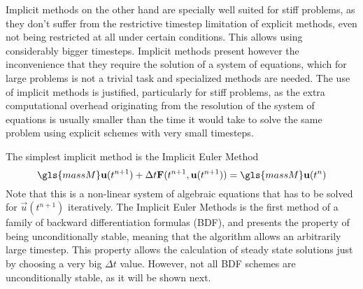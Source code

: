 Implicit methods  on the other hand are specially well suited for stiff problems, as they don't suffer from the restrictive timestep limitation of explicit methods, even not being restricted at all under certain conditions. This allows using considerably bigger timesteps. Implicit methods present however the inconvenience that they require the solution of a system of equations, which for large problems is not a trivial task and specialized methods are needed. The use of implicit methods is justified, particularly for stiff problems, as the extra computational overhead originating from the resolution of the system of equations is usually smaller than the time it would take to solve the same problem using explicit schemes with very small timesteps.

The simplest implicit method is the Implicit Euler Method 
\begin{equation}
\gls{massM}\vec{u}(t^{n+1}) + \Delta t\vec{F}(t^{n+1},\vec{u}(t^{n+1}))= \gls{massM}\vec{u}(t^{n})  
\end{equation}
Note that this is a non-linear system of algebraic equations that has to be solved for $\vec{u}(t^{n+1})$ iteratively. The Implicit Euler Methods is the first method of a family of backward differentiation formulas (BDF), and presents the property of being unconditionally stable, meaning that the algorithm allows an arbitrarily large timestep. This property allows the calculation of steady state solutions just by choosing a very big $\Delta t$ value. However, not all BDF schemes are unconditionally stable, as it will be shown next.
